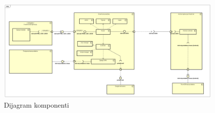 			\begin{figure}[H]
				\centering
				\includegraphics[width=1.0\linewidth]{dijagrami/component.png}
				\caption{Dijagram komponenti}
				\label{fig:cmp-component}
			\end{figure}
			
			
			\eject

